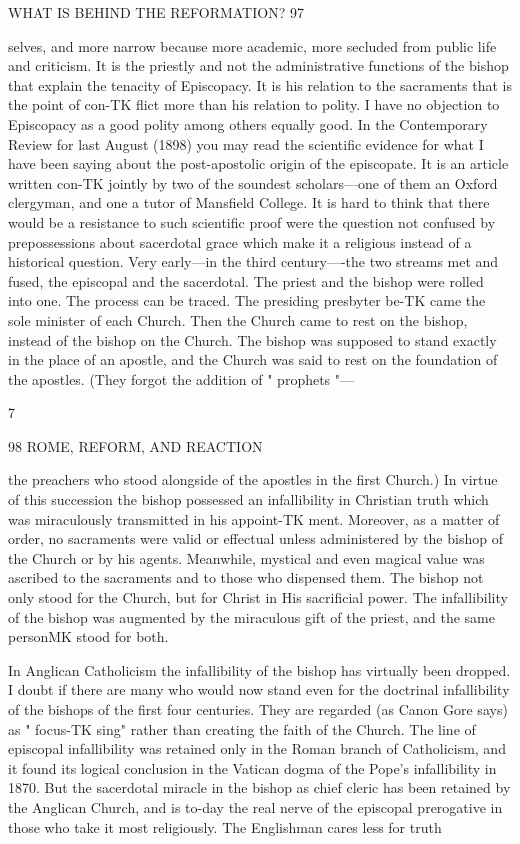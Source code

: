 \documentclass[12pt,a5paper,oneside]{book}
\begin{document}
WHAT IS BEHIND THE REFORMATION? 97 

selves, and more narrow because more academic, more 
secluded from public life and criticism. It is the 
priestly and not the administrative functions of the 
bishop that explain the tenacity of Episcopacy. It is 
his relation to the sacraments that is the point of con-TK
flict more than his relation to polity. I have no 
objection to Episcopacy as a good polity among others 
equally good. In the Contemporary Review for last 
August (1898) you may read the scientific evidence 
for what I have been saying about the post-apostolic 
origin of the episcopate. It is an article written con-TK
jointly by two of the soundest scholars---one of them 
an Oxford clergyman, and one a tutor of Mansfield 
College. It is hard to think that there would be a 
resistance to such scientific proof were the question not 
confused by prepossessions about sacerdotal grace which 
make it a religious instead of a historical question. 
Very early---in the third century----the two streams 
met and fused, the episcopal and the sacerdotal. The 
priest and the bishop were rolled into one. The 
process can be traced. The presiding presbyter be-TK
came the sole minister of each Church. Then the 
Church came to rest on the bishop, instead of the 
bishop on the Church. The bishop was supposed to 
stand exactly in the place of an apostle, and the 
Church was said to rest on the foundation of the 
apostles. (They forgot the addition of " prophets "---

7 



98 ROME, REFORM, AND REACTION 

the preachers who stood alongside of the apostles in 
the first Church.) In virtue of this succession the 
bishop possessed an infallibility in Christian truth 
which was miraculously transmitted in his appoint-TK
ment. Moreover, as a matter of order, no sacraments 
were valid or effectual unless administered by the 
bishop of the Church or by his agents. Meanwhile, 
mystical and even magical value was ascribed to the 
sacraments and to those who dispensed them. The 
bishop not only stood for the Church, but for Christ 
in His sacrificial power. The infallibility of the 
bishop was augmented by the miraculous gift of the 
priest, and the same personMK stood for both. 

In Anglican Catholicism the infallibility of the 
bishop has virtually been dropped. I doubt if there 
are many who would now stand even for the doctrinal 
infallibility of the bishops of the first four centuries. 
They are regarded (as Canon Gore says) as " focus-TK
sing" rather than creating the faith of the Church. 
The line of episcopal infallibility was retained only 
in the Roman branch of Catholicism, and it found 
its logical conclusion in the Vatican dogma of the 
Pope's infallibility in 1870. But the sacerdotal 
miracle in the bishop as chief cleric has been retained 
by the Anglican Church, and is to-day the real nerve 
of the episcopal prerogative in those who take it most 
religiously. The Englishman cares less for truth 
\end{document}
